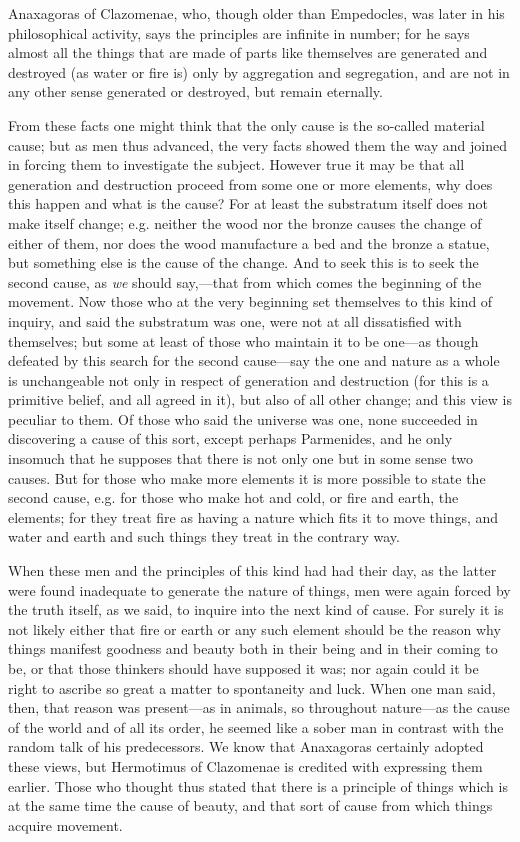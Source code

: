 Anaxagoras of Clazomenae, who, though older than Empedocles, was later in his philosophical activity, says the principles are infinite in number; for he says almost all the things that are made of parts like themselves are generated and destroyed (as water or fire is) only by aggregation and segregation, and are not in any other sense generated or destroyed, but remain eternally.

From these facts one might think that the only cause is the so-called material cause; but as men thus advanced, the very facts showed them the way and joined in forcing them to investigate the subject. However true it may be that all generation and destruction proceed from some one or more elements, why does this happen and what is the cause? For at least the substratum itself does not make itself change; e.g. neither the wood nor the bronze causes the change of either of them, nor does the wood manufacture a bed and the bronze a statue, but something else is the cause of the change. And to seek this is to seek the second cause, as \emph{we} should say,—that from which comes the beginning of the movement. Now those who at the very beginning set themselves to this kind of inquiry, and said the substratum was one, were not at all dissatisfied with themselves; but some at least of those who maintain it to be one—as though defeated by this search for the second cause—say the one and nature as a whole is unchangeable not only in respect of generation and destruction (for this is a primitive belief, and all agreed in it), but also of all other change; and this view is peculiar to them. Of those who said the universe was one, none succeeded in discovering a cause of this sort, except perhaps Parmenides, and he only insomuch that he supposes that there is not only one but in some sense two causes. But for those who make more elements it is more possible to state the second cause, e.g. for those who make hot and cold, or fire and earth, the elements; for they treat fire as having a nature which fits it to move things, and water and earth and such things they treat in the contrary way.

When these men and the principles of this kind had had their day, as the latter were found inadequate to generate the nature of things, men were again forced by the truth itself, as we said, to inquire into the next kind of cause. For surely it is not likely either that fire or earth or any such element should be the reason why things manifest goodness and beauty both in their being and in their coming to be, or that those thinkers should have supposed it was; nor again could it be right to ascribe so great a matter to spontaneity and luck. When one man said, then, that reason was present—as in animals, so throughout nature—as the cause of the world and of all its order, he seemed like a sober man in contrast with the random talk of his predecessors. We know that Anaxagoras certainly adopted these views, but Hermotimus of Clazomenae is credited with expressing them earlier. Those who thought thus stated that there is a principle of things which is at the same time the cause of beauty, and that sort of cause from which things acquire movement.

